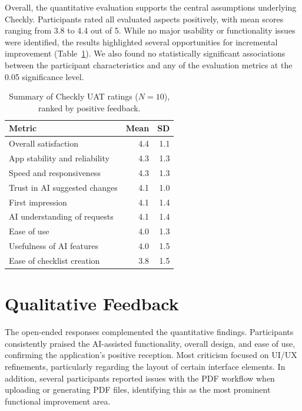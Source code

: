 \documentclass[11pt]{article}
\begin{document}
\begin{table}[htbp]
    \begin{minipage}[t]{0.56\textwidth}
        \vspace{0pt}
        Overall, the quantitative evaluation supports the central assumptions underlying Checkly. Participants rated all evaluated aspects positively, with mean scores ranging from 3.8 to 4.4 out of 5. While no major usability or functionality issues were identified, the results highlighted several opportunities for incremental improvement (Table~\ref{tab:uat-summary}). We also found no statistically significant associations between the participant characteristics and any of the evaluation metrics at the 0.05 significance level.
    \end{minipage}\hfill
    \begin{minipage}[t]{0.40\textwidth}
        \vspace{0pt}
        \centering
        \captionsetup{font=footnotesize}
        \caption{Summary of Checkly UAT ratings (\(N=10\)), ranked by positive feedback.}
        \label{tab:uat-summary}
        \footnotesize
        \setlength{\tabcolsep}{3pt}
        \raggedleft
        \begin{tabularx}{\linewidth}{Xrr}
            \toprule
            Metric & Mean & SD \\
            \midrule
            Overall satisfaction & 4.4 & 1.1 \\
            App stability and reliability & 4.3 & 1.3 \\
            Speed and responsiveness & 4.3 & 1.3 \\
            Trust in AI suggested changes & 4.1 & 1.0 \\
            First impression & 4.1 & 1.4 \\
            AI understanding of requests & 4.1 & 1.4 \\
            Ease of use & 4.0 & 1.3 \\
            Usefulness of AI features & 4.0 & 1.5 \\
            Ease of checklist creation & 3.8 & 1.5 \\
            \bottomrule
        \end{tabularx}
    \end{minipage}
\end{table}

\section{Qualitative Feedback}
The open-ended responses complemented the quantitative findings. Participants consistently praised the AI-assisted functionality, overall design, and ease of use, confirming the application's positive reception. Most criticism focused on UI/UX refinements, particularly regarding the layout of certain interface elements. In addition, several participants reported issues with the PDF workflow when uploading or generating PDF files, identifying this as the most prominent functional improvement area.
\end{document}
